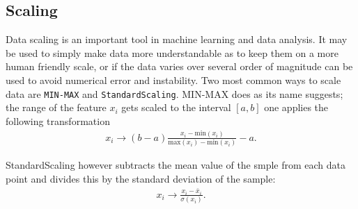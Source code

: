 \documentclass[%
reprint,
amsmath,amssymb,
aps,
pra,
]{revtex4-2}
\begin{document}
\subsection{Scaling}
Data scaling is an important tool in machine learning and data analysis. It may be used to simply make data more understandable as to keep them on a more human friendly scale, or if the data varies over several order of magnitude can be used to avoid numerical error and instability. Two most common ways to scale data are \texttt{MIN-MAX} and \texttt{StandardScaling}. MIN-MAX does as its name suggests; the range of the feature $x_i$ gets scaled to the interval $[a,b]$ one applies the following transformation
\begin{align}
	x_i\to(b-a)\frac{x_i-\text{min}(x_i)}{\text{max}(x_i)-\text{min}(x_i)}-a.
\end{align}

StandardScaling however subtracts the mean value of the smple from each data point and divides this by the standard deviation of the sample:
\begin{align}
	x_i\to\frac{x_i-\bar x_i}{\sigma(x_i)}.
\end{align}
\end{document}
